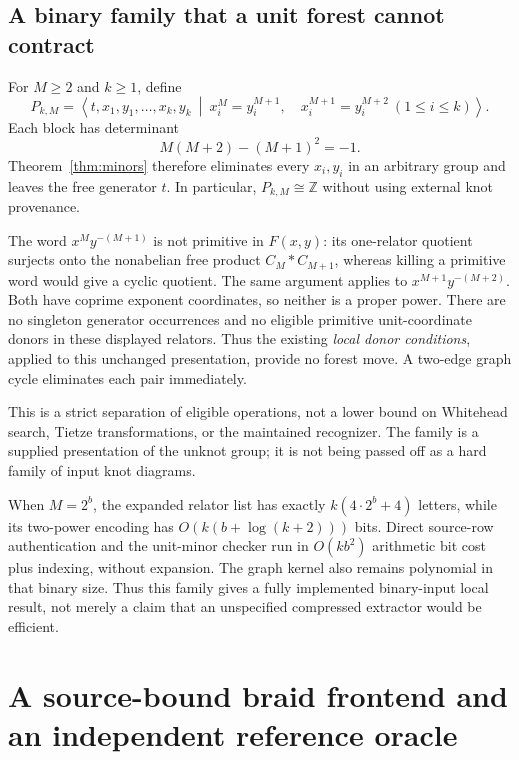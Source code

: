 \documentclass[11pt]{article}
\theoremstyle{definition}\newtheorem{definition}[theorem]{Definition}
\theoremstyle{remark}\newtheorem{remark}[theorem]{Remark}
\newcommand{\Z}{\mathbb Z}\newcommand{\Q}{\mathbb Q}\newcommand{\F}{\mathbb F}
\begin{document}
\subsection{A binary family that a unit forest cannot contract}
For $M\ge2$ and $k\ge1$, define
\begin{equation}\label{eq:family}
 P_{k,M}=\left\langle t,x_1,y_1,\ldots,x_k,y_k\ \middle|\
 x_i^M=y_i^{M+1},\quad x_i^{M+1}=y_i^{M+2}\ (1\le i\le k)
 \right\rangle.
\end{equation}
Each block has determinant
\[
 M(M+2)-(M+1)^2=-1.
\]
Theorem~\ref{thm:minors} therefore eliminates every $x_i,y_i$ in an
arbitrary group and leaves the free generator $t$. In particular,
$P_{k,M}\cong\Z$ without using external knot provenance.

The word $x^M y^{-(M+1)}$ is not primitive in $F(x,y)$: its one-relator
quotient surjects onto the nonabelian free product $C_M*C_{M+1}$, whereas
killing a primitive word would give a cyclic quotient. The same argument
applies to $x^{M+1}y^{-(M+2)}$. Both have coprime exponent coordinates, so
neither is a proper power. There are no singleton generator occurrences
and no eligible primitive unit-coordinate donors in these displayed
relators. Thus the existing \emph{local donor conditions}, applied to this
unchanged presentation, provide no forest move. A two-edge graph cycle
eliminates each pair immediately.

This is a strict separation of eligible operations, not a lower bound on
Whitehead search, Tietze transformations, or the maintained recognizer.
The family is a supplied presentation of the unknot group; it is not
being passed off as a hard family of input knot diagrams.

When $M=2^b$, the expanded relator list has exactly
$k(4\cdot2^b+4)$ letters, while its two-power encoding has
$O(k(b+\log(k+2)))$ bits. Direct source-row authentication and the
unit-minor checker run in $O(kb^2)$ arithmetic bit cost plus indexing,
without expansion. The graph kernel also remains polynomial in that
binary size. Thus this family gives a fully implemented binary-input
local result, not merely a claim that an unspecified compressed extractor
would be efficient.

\section{A source-bound braid frontend and an independent reference oracle}
\label{sec:source}
\end{document}
